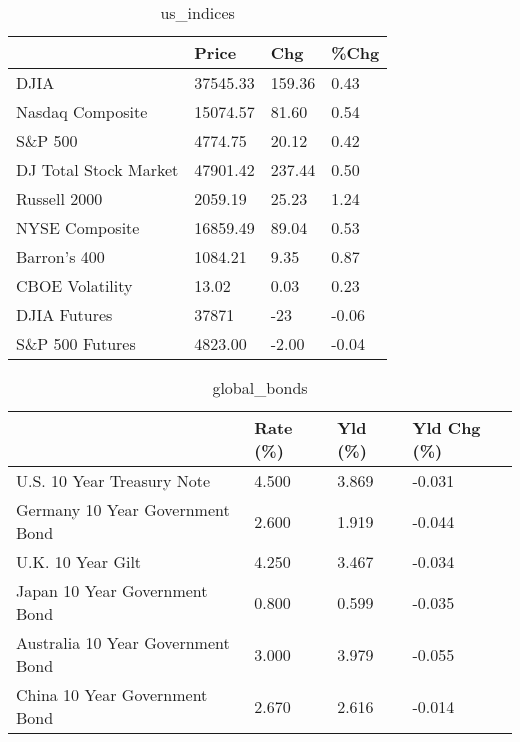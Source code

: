 \documentclass{article}%
\begin{document}
%


\begin{table}[htbp]%
\caption{us\_indices}%
\centering%
\begin{adjustbox}{width=1\textwidth}%
\begin{tabular}{llll}
\toprule
                      &    Price &    Chg &  \%Chg \\
\midrule
                 DJIA & 37545.33 & 159.36 &  0.43 \\
     Nasdaq Composite & 15074.57 &  81.60 &  0.54 \\
              S\&P 500 &  4774.75 &  20.12 &  0.42 \\
DJ Total Stock Market & 47901.42 & 237.44 &  0.50 \\
         Russell 2000 &  2059.19 &  25.23 &  1.24 \\
       NYSE Composite & 16859.49 &  89.04 &  0.53 \\
         Barron's 400 &  1084.21 &   9.35 &  0.87 \\
      CBOE Volatility &    13.02 &   0.03 &  0.23 \\
         DJIA Futures &    37871 &    -23 & -0.06 \\
      S\&P 500 Futures &  4823.00 &  -2.00 & -0.04 \\
\bottomrule
\end{tabular}
%
\end{adjustbox}%
\end{table}

%


\begin{table}[htbp]%
\caption{global\_bonds}%
\centering%
\begin{adjustbox}{width=1\textwidth}%
\begin{tabular}{llll}
\toprule
                                  & Rate (\%) & Yld (\%) & Yld Chg (\%) \\
\midrule
       U.S. 10 Year Treasury Note &    4.500 &   3.869 &      -0.031 \\
  Germany 10 Year Government Bond &    2.600 &   1.919 &      -0.044 \\
                U.K. 10 Year Gilt &    4.250 &   3.467 &      -0.034 \\
    Japan 10 Year Government Bond &    0.800 &   0.599 &      -0.035 \\
Australia 10 Year Government Bond &    3.000 &   3.979 &      -0.055 \\
    China 10 Year Government Bond &    2.670 &   2.616 &      -0.014 \\
\bottomrule
\end{tabular}
%
\end{adjustbox}%
\end{table}
\end{document}
